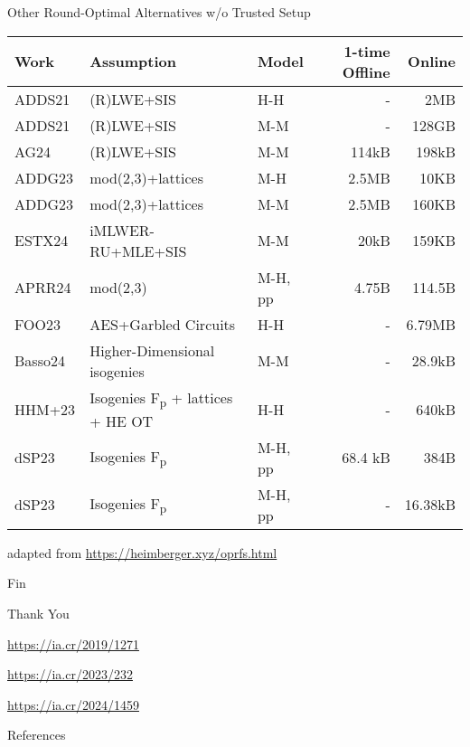 \documentclass[xcolor=table,10pt,aspectratio=169]{beamer}
\begin{document}
\begin{frame}[label={sec:org1bec1c2}]{Other Round-Optimal Alternatives w/o Trusted Setup}
\begin{small}

\begin{center}
\begin{tabular}{lllrr}
\toprule
Work & Assumption & Model & 1-time Offline & Online\\
\midrule
ADDS21 & (R)LWE+SIS & H-H & - & 2MB\\
ADDS21 & (R)LWE+SIS & M-M & - & 128GB\\
AG24 & (R)LWE+SIS & M-M & 114kB & 198kB\\
ADDG23 & mod(2,3)+lattices & M-H & 2.5MB & 10KB\\
ADDG23 & mod(2,3)+lattices & M-M & 2.5MB & 160KB\\
ESTX24 & iMLWER-RU+MLE+SIS & M-M & 20kB & 159KB\\
APRR24 & mod(2,3) & M-H, pp & 4.75B & 114.5B\\
FOO23 & AES+Garbled Circuits & H-H & - & 6.79MB\\
Basso24 & Higher-Dimensional isogenies & M-M & - & 28.9kB\\
HHM+23 & Isogenies F\textsubscript{p} + lattices + HE OT & H-H & - & 640kB\\
dSP23 & Isogenies F\textsubscript{p} & M-H, pp & 68.4 kB & 384B\\
dSP23 & Isogenies F\textsubscript{p} & M-H, pp & - & 16.38kB\\
\bottomrule
\end{tabular}

\end{center}

\end{small}

\begin{center}
{\footnotesize adapted from \url{https://heimberger.xyz/oprfs.html} \par}
\end{center}
\end{frame}
\begin{frame}[label={sec:orge39b532},standout]{Fin}
\begin{center}
{\Huge\alert{Thank You}\par}

\url{https://ia.cr/2019/1271}

\url{https://ia.cr/2023/232}

\url{https://ia.cr/2024/1459}
\end{center}
\end{frame}
\begin{frame}[allowframebreaks]{References}
\renewcommand*{\bibfont}{\scriptsize}
\printbibliography[heading=none]
\end{frame}
\end{document}
